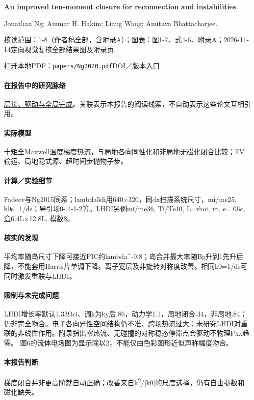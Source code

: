 \documentclass[UTF8,a4paper,11pt,openany,fontset=fandol]{ctexbook}
\begin{document}
\textbf{An improved ten-moment closure for reconnection and instabilities}\citep{Ng2020}\

Jonathan Ng;  Ammar H. Hakim;  Liang Wang;  Amitava Bhattacharjee.

\textsf{核读范围：}1-8（作者稿全部，含附录A）；\textsf{图表：}图1-7、式4-6、附录A；2026-11-14定向视觉复核全部结果图及附录页.

\href{run:../papers/Ng2020.pdf}{打开本地PDF：\texttt{papers/Ng2020.pdf}}\quad\href{https://doi.org/10.1063/5.0012067}{DOI／版本入口}

\paragraph{在报告中的研究脉络}\hyperref[story:global]{层长、驱动与全局完成}。关联表示本报告的阅读线索，不自动表示这些论文互相引用。

\paragraph{实际模型}十矩全Maxwell温度梯度热流，与局地各向同性化和非局地无磁化闭合比较；FV输运、局地隐式源、超时间步抛物子步。

\paragraph{计算／实验细节}Fadeev与Ng2015同系；lambda5di用640×320，同dx扫描系统尺寸，mi/me25, k0s=1/ds；导引场0-.4-1-2等。LHDI另例mi/me36, Ti/Te10, L=rhoi, vt, e=.06c, 盒6.4L×12.8L, 模数8。

\paragraph{核实的发现}平均率随岛尺寸下降可接近PIC约lambda\textasciicircum{}-0.8；岛合并最大率随Bg升到1先升后降，不能套用Harris片单调下降。离子宽层及非旋转对称度改善。相同k0=1/ds可同时激发重联与LHDI。

\paragraph{限制与未完成问题}LHDI增长率默认1.33Ωci、调k为ky后.86，动力学1.1，局地闭合.34，非局地.84；仍非完全吻合。电子各向异性空间结构仍不准、跨场热流过大；未研究LHDI对重联的非线性作用。附录指出零热流、无碰撞的对称稳态停滞点会驱动不物理Pxx趋零。 图6的流体电场图为显示除以2，不能仅由色彩图形近似声称幅度吻合。

\paragraph{本报告判断}梯度闭合并非更高阶就自动正确；改善来自k\textsuperscript{2}/|k0|的尺度选择，仍有自由参数和磁化缺失。
\end{document}
